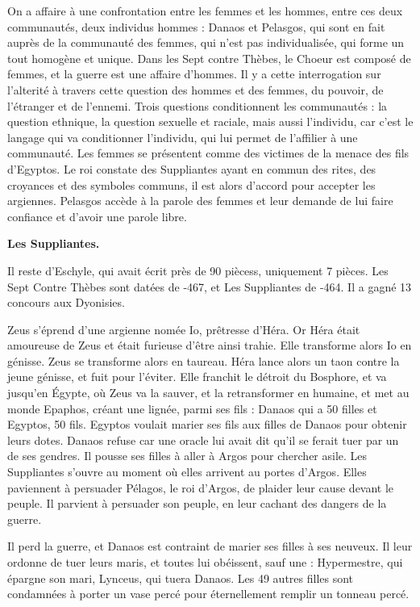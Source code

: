 \documentclass[11pt]{article}
\begin{document}
On a affaire à une confrontation entre les femmes et les hommes, entre ces deux communautés, deux individus hommes : Danaos et Pelasgos, qui sont en fait auprès de la communauté des femmes, qui n'est pas individualisée, qui forme un tout homogène et unique. Dans les Sept contre Thèbes, le Choeur est composé de femmes, et la guerre est une affaire d'hommes. Il y a cette interrogation sur l'alterité à travers cette question des hommes et des femmes, du pouvoir, de l'étranger et de l'ennemi.
Trois questions conditionnent les communautés : la question ethnique, la question sexuelle et raciale, mais aussi l'individu, car c'est le langage qui va conditionner l'individu, qui lui permet de l'affilier à une communauté. Les femmes se présentent comme des victimes de la menace des fils d'Egyptos.
Le roi constate des Suppliantes ayant en commun des rites, des croyances et des symboles communs, il est alors d'accord pour accepter les argiennes. Pelasgos accède à la parole des femmes et leur demande de lui faire confiance et d'avoir une parole libre.

\bf{Les Suppliantes.}

Il reste d'Eschyle, qui avait écrit près de 90 piècess, uniquement 7 pièces. Les Sept Contre Thèbes sont datées de -467, et Les Suppliantes de -464. Il a gagné 13 concours aux Dyonisies.

Zeus s'éprend d'une argienne nomée Io, prêtresse d'Héra. Or Héra était amoureuse de Zeus et était furieuse d'être ainsi trahie. Elle transforme alors Io en génisse. Zeus se transforme alors en taureau. Héra lance alors un taon contre la jeune génisse, et fuit pour l'éviter. Elle franchit le détroit du Bosphore, et va jusqu'en Égypte, où Zeus va la sauver, et la retransformer en humaine, et met au monde Epaphos, créant une lignée, parmi ses fils : Danaos qui a 50 filles et Egyptos, 50 fils. Egyptos voulait marier ses fils aux filles de Danaos pour obtenir leurs dotes. Danaos refuse car une oracle lui avait dit qu'il se ferait tuer par un de ses gendres. Il pousse ses filles à aller à Argos pour chercher asile. Les Suppliantes s'ouvre au moment où elles arrivent au portes d'Argos. Elles paviennent à persuader Pélagos, le roi d'Argos, de plaider leur cause devant le peuple. Il parvient à persuader son peuple, en leur cachant des dangers de la guerre.

Il perd la guerre, et Danaos est contraint de marier ses filles à ses neuveux. Il leur ordonne de tuer leurs maris, et toutes lui obéissent, sauf une : Hypermestre, qui épargne son mari, Lynceus, qui tuera Danaos. Les 49 autres filles sont condamnées à porter un vase percé pour éternellement remplir un tonneau percé.
\end{document}
